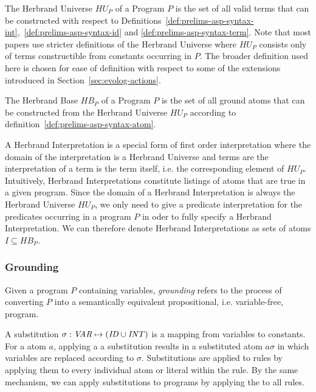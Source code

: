 \begin{definition}
\label{def:prelims-asp-semantics-hu}
The Herbrand Universe $HU_P$ of a Program $P$ is the set of all valid terms that can be constructed with respect to Definitions~\ref{def:prelims-asp-syntax-int},~\ref{def:prelims-asp-syntax-id} and \ref{def:prelims-asp-syntax-term}.
Note that most papers use stricter definitions of the Herbrand Universe where $HU_P$ consists only of terms constructible from constants occurring in $P$. The broader definition used here is chosen for ease of definition with respect to some of the extensions introduced in Section~\ref{sec:evolog-actions}.
\end{definition}

\begin{definition}
\label{def:prelims-asp-semantics-hb}
The Herbrand Base $HB_P$ of a Program $P$ is the set of all ground atoms that can be constructed from the Herbrand Universe $HU_P$ according to definition~\ref{def:prelims-asp-syntax-atom}. 
\end{definition}

\begin{definition}
\label{def:prelims-asp-semantics-herbrand-interpretation}
A Herbrand Interpretation is a special form of first order interpretation where the domain of the interpretation is a Herbrand Universe and terms are the interpretation of a term is the term itself, i.e. the corresponding element of $HU_P$. Intuitively, Herbrand Interpretations constitute listings of atoms that are true in a given program. Since the domain of a Herbrand Interpretation is always the Herbrand Universe $HU_P$, we only need to give a predicate interpretation for the predicates occurring in a program $P$ in oder to fully specify a Herbrand Interpretation. We can therefore denote Herbrand Interpretations as sets of atoms $I \subseteq HB_P$.
\end{definition}

\subsubsection{Grounding}
\label{subsubsec:prelims-grounding}
Given a program $P$ containing variables, \emph{grounding} refers to the process of converting $P$ into a semantically equivalent propositional, i.e. variable-free, program.

\begin{definition}
\label{def:prelims-asp-semantics-substitution}
A substitution $\sigma: \mathit{VAR} \mapsto (\mathit{ID} \cup \mathit{INT})$ is a mapping from variables to constants. For a atom $a$, applying a a substitution results in a substituted atom $a\sigma$ in which variables are replaced according to $\sigma$. Substitutions are applied to rules  by applying them to every individual atom or literal within the rule. By the same mechanism, we can apply substitutions to programs by applying the to all rules.
\end{definition}


